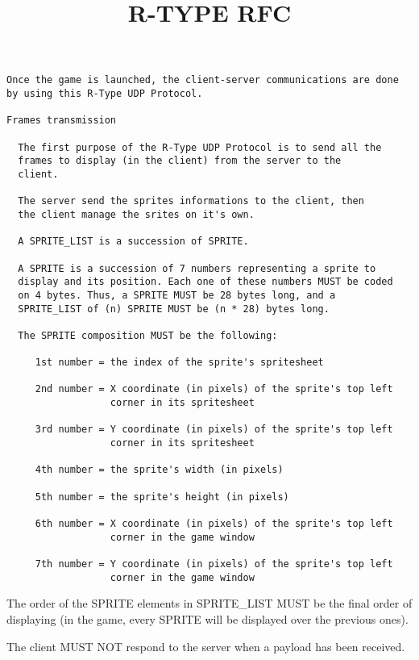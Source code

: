 \documentclass[12pt, letterpaper]{article}\title{R-TYPE RFC}
\begin{document}
\begin{verbatim}
Once the game is launched, the client-server communications are done
by using this R-Type UDP Protocol.

Frames transmission

  The first purpose of the R-Type UDP Protocol is to send all the
  frames to display (in the client) from the server to the
  client.

  The server send the sprites informations to the client, then
  the client manage the srites on it's own.

  A SPRITE_LIST is a succession of SPRITE.

  A SPRITE is a succession of 7 numbers representing a sprite to
  display and its position. Each one of these numbers MUST be coded
  on 4 bytes. Thus, a SPRITE MUST be 28 bytes long, and a
  SPRITE_LIST of (n) SPRITE MUST be (n * 28) bytes long.

  The SPRITE composition MUST be the following:

     1st number = the index of the sprite's spritesheet

     2nd number = X coordinate (in pixels) of the sprite's top left
                  corner in its spritesheet

     3rd number = Y coordinate (in pixels) of the sprite's top left
                  corner in its spritesheet

     4th number = the sprite's width (in pixels)

     5th number = the sprite's height (in pixels)

     6th number = X coordinate (in pixels) of the sprite's top left
                  corner in the game window

     7th number = Y coordinate (in pixels) of the sprite's top left
                  corner in the game window
\end{verbatim}

The order of the SPRITE elements in SPRITE\_LIST MUST be the final order
of displaying (in the game, every SPRITE will be displayed over the
previous ones).

The client MUST NOT respond to the server when a payload has been
received.
\end{document}
